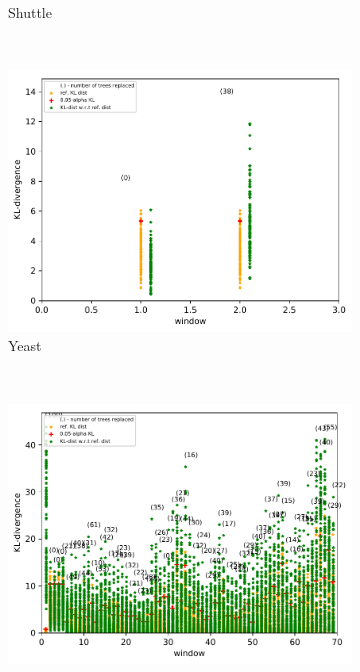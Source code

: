 \documentclass{article} %
\begin{document}
\begin{figure}
\begin{subfigure}[b]{0.23\textwidth}
    	\caption{Shuttle}
    	\label{fig:concept_drift_shuttle}
    \end{subfigure}
    ~ %
    \begin{subfigure}[b]{0.23\textwidth}
    	\includegraphics[width=\textwidth]{figures/test_concept_drift_yeast}
    	\caption{Yeast}
    	\label{fig:concept_drift_yeast}
    \end{subfigure}
    ~ %
    \begin{subfigure}[b]{0.23\textwidth}
    	\includegraphics[width=\textwidth]{figures/test_concept_drift_covtype}

\end{subfigure}
\end{figure}
\end{document}
